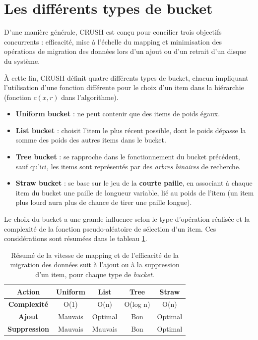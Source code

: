 \section{Les différents types de bucket}
\label{sssec:bucket}

D'une manière générale, CRUSH est conçu pour concilier trois objectifs concurrents : efficacité, mise à l'échelle du mapping et minimisation des opérations de migration des données lors d'un ajout ou d'un retrait d'un disque du système. 

À cette fin, CRUSH définit quatre différents types de bucket, chacun impliquant l'utilisation d'une fonction différente pour le choix d'un item dans la hiérarchie (fonction $c(x,r)$ dans l'algorithme).

\begin{itemize}
\item \textbf{Uniform bucket} : ne peut contenir que des items de poids égaux.
\item \textbf{List bucket} : choisit l'item le plus récent possible, dont le poids dépasse la somme des poids des autres items dans le bucket.
\item \textbf{Tree bucket} : se rapproche dans le fonctionnement du bucket précédent, sauf qu'ici, les items sont représentés par des \textit{arbres binaires} de recherche.
\item \textbf{Straw bucket} : se base sur le jeu de la \textbf{courte paille}, en associant à chaque item du bucket une paille de longueur variable, lié au poids de l'item (un item plus lourd aura plus de chance de tirer une paille longue).
\end{itemize}

Le choix du bucket a une grande influence selon le type d'opération réalisée et la complexité de la fonction pseudo-aléatoire de sélection d'un item.
Ces considérations sont résumées dans le tableau \ref{chap3:tabBucket}.

\begin{table}
	\centering
  		\begin{tabular}{|c|c|c|c|c|}
           \hline
           \textbf{Action} & Uniform & List & Tree & Straw\\
           \hline
           \textbf{Complexité} & O(1) & O(n) & O(log n) &  O(n)  \\
           \hline
           \textbf{Ajout} & Mauvais & Optimal &  Bon & Optimal \\
           \hline
           \textbf{Suppression} & Mauvais & Mauvais &  Bon & Optimal \\
           \hline
  		\end{tabular}
        \caption{Résumé de la vitesse de mapping et de l'efficacité de la migration des données suit à l'ajout ou à la suppression d'un item, pour chaque type de \textit{bucket}.} \label{chap3:tabBucket}
\end{table}
\newpage

